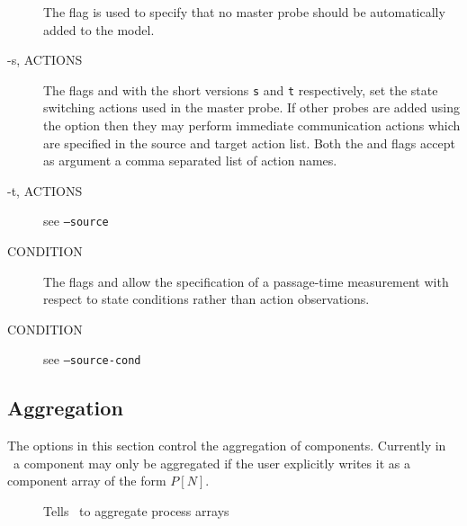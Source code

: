 \begin{description}
\item[ ]
The flag  is used to specify that
no master probe %
should be automatically added to the model.

\end{description}

\begin{description}
\item[-s,  ACTIONS]
The flags  and 
with the short versions \texttt{s} and \texttt{t}
respectively, set the state switching actions used
in the master probe. If other probes are added using the
 option then they may perform immediate
communication actions which are specified in the source and
target action list.
Both the  and  flags
accept as argument a comma separated list of action names.

\end{description}

\begin{description}
\item[-t,  ACTIONS]
see \texttt{--source}
\end{description}

\begin{description}
\item[ CONDITION]
The flags  and 
allow the specification of a passage-time measurement 
with respect to state conditions rather than action
observations.

\end{description}

\begin{description}
\item[ CONDITION]
see \texttt{--source-cond}
\end{description}


\subsection{Aggregation}
The options in this section control the aggregation
of components.
Currently in \commandNameIpcSmc\ a component may
only be aggregated if the user explicitly writes it
as a component array of the form $P[N]$.

\begin{description}
\item[ ]
Tells \commandNameIpcSmc\ to aggregate process arrays

\end{description}

